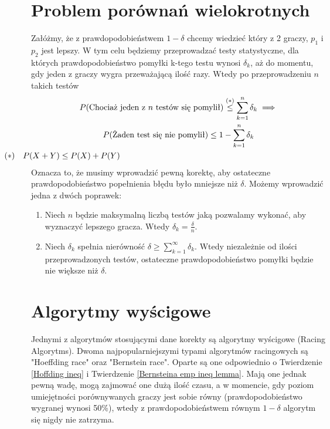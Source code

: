 \documentclass[inzynierska]{pwr_wmat_praca_dyplomowa}
\theoremstyle{plain}
\numberwithin{theorem}{chapter}
\theoremstyle{definition}
\numberwithin{theorem}{chapter}
\begin{document}
	\section{Problem porównań wielokrotnych}
	Załóżmy, że z prawdopodobieństwem $1-\delta$ chcemy wiedzieć który z 2 graczy, $p_1$ i $p_2$ jest lepszy. W tym
	celu będziemy przeprowadzać testy statystyczne, dla których
	prawdopodobieństwo pomyłki k-tego testu wynosi $\delta_k$, aż do momentu, gdy jeden z graczy wygra przeważającą ilość razy. Wtedy po przeprowadzeniu $n$ takich testów
	\begin{gather*}
		P(\text{Chociaż jeden z $n$ testów się pomylił}) \overset{(*)}{\le} \sum_{k=1}^n \delta_k \implies  \\
	P(\text{Żaden test się nie pomylił}) \le 1 - \sum_{k=1}^n \delta_k \\
	\hspace*{-10cm} (*) \quad P(X+Y) \le P(X) + P(Y) 
	\end{gather*} 
	Oznacza to, że musimy wprowadzić pewną korektę, aby
	ostateczne prawdopodobieństwo popełnienia błędu było
	mniejsze niż $\delta$.
	Możemy wprowadzić jedna z dwóch poprawek:

	\begin{enumerate}[label=\thesection.\arabic*]
		\item \label{korekta 1} Niech $n$ będzie maksymalną liczbą testów jaką pozwalamy wykonać, aby wyznaczyć lepszego
		gracza. Wtedy $\delta_k=\frac{\delta}{n}$.
		\item \label{korekta 2} Niech $\delta_k$ spełnia nierówność $ \delta \ge \displaystyle\sum_{k = 1}^{\infty}\delta_k$. Wtedy niezależnie od
		ilości przeprowadzonych testów, ostateczne
		prawdopodobieństwo pomyłki będzie nie większe niż
		$\delta$.
	\end{enumerate}

	\section{Algorytmy wyścigowe}
	Jednymi z algorytmów stosującymi dane korekty są algorytmy wyścigowe
	(Racing \\Algorytms). Dwoma najpopularniejszymi typami algorytmów racingowych są "Hoeﬀding race" oraz "Bernstein race".
	Oparte są one odpowiednio o Twierdzenie \ref{Hoffding ineq} i Twierdzenie \ref{Bernsteina emp ineq lemma}. Mają one jednak pewną wadę, mogą zajmować one dużą ilość czasu, a w momencie, gdy poziom umiejętności porównywanych graczy jest sobie równy (prawdopodobieństwo wygranej wynosi 50\%), wtedy z prawdopodobieństwem równym $1-\delta$ algorytm się nigdy nie zatrzyma.
	
\end{document}
